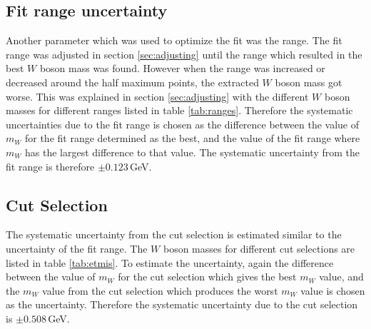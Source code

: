 \subsection{Fit range uncertainty}
    Another parameter which was used to optimize the fit was the range. The fit range was adjusted in section \ref{sec:adjusting} until the range which resulted in the 
    best $W$ boson mass was found. However when the range was increased or decreased around the half maximum points, the extracted $W$ boson mass got worse.
    This was explained in section \ref{sec:adjusting} with the different $W$ boson masses for different ranges listed in table \ref{tab:ranges}.
    Therefore the systematic uncertainties due to the fit range is chosen as the difference between the value of $m_W$ for the fit range determined as the best,
    and the value of the fit range where $m_W$ has the largest difference to that value. The systematic uncertainty from the fit range is therefore $\pm0.123$\,GeV. 

\subsection{Cut Selection}
    The systematic uncertainty from the cut selection is estimated similar to the uncertainty of the fit range.
    The $W$ boson masses for different cut selections are listed in table \ref{tab:etmis}. To estimate the uncertainty, again the difference between the value of $m_W$
    for the cut selection which gives the best $m_W$ value, and the $m_W$ value from the cut selection which produces the worst $m_W$ value is chosen as the uncertainty.
    Therefore the systematic uncertainty due to the cut selection is $\pm 0.508$\,GeV.

